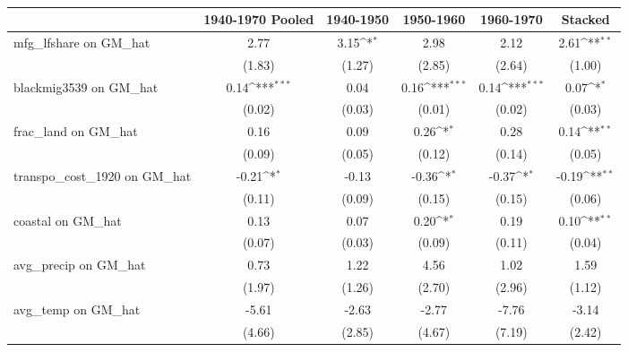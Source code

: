 \begin{table}[htbp]\centering
\def\sym#1{\ifmmode^{#1}\else\(^{#1}\)\fi}
\caption{}
\begin{tabular}{l*{5}{c}}
\toprule
                &\multicolumn{1}{c}{1940-1970 Pooled}&\multicolumn{1}{c}{1940-1950}&\multicolumn{1}{c}{1950-1960}&\multicolumn{1}{c}{1960-1970}&\multicolumn{1}{c}{Stacked}\\
\midrule
mfg\_lfshare on GM\_hat&     2.77         &     3.15\sym{*}  &     2.98         &     2.12         &     2.61\sym{**} \\
                &   (1.83)         &   (1.27)         &   (2.85)         &   (2.64)         &   (1.00)         \\
\addlinespace
blackmig3539 on GM\_hat&     0.14\sym{***}&     0.04         &     0.16\sym{***}&     0.14\sym{***}&     0.07\sym{*}  \\
                &   (0.02)         &   (0.03)         &   (0.01)         &   (0.02)         &   (0.03)         \\
\addlinespace
frac\_land on GM\_hat&     0.16         &     0.09         &     0.26\sym{*}  &     0.28         &     0.14\sym{**} \\
                &   (0.09)         &   (0.05)         &   (0.12)         &   (0.14)         &   (0.05)         \\
\addlinespace
transpo\_cost\_1920 on GM\_hat&    -0.21\sym{*}  &    -0.13         &    -0.36\sym{*}  &    -0.37\sym{*}  &    -0.19\sym{**} \\
                &   (0.11)         &   (0.09)         &   (0.15)         &   (0.15)         &   (0.06)         \\
\addlinespace
coastal on GM\_hat&     0.13         &     0.07         &     0.20\sym{*}  &     0.19         &     0.10\sym{**} \\
                &   (0.07)         &   (0.03)         &   (0.09)         &   (0.11)         &   (0.04)         \\
\addlinespace
avg\_precip on GM\_hat&     0.73         &     1.22         &     4.56         &     1.02         &     1.59         \\
                &   (1.97)         &   (1.26)         &   (2.70)         &   (2.96)         &   (1.12)         \\
\addlinespace
avg\_temp on GM\_hat&    -5.61         &    -2.63         &    -2.77         &    -7.76         &    -3.14         \\
                &   (4.66)         &   (2.85)         &   (4.67)         &   (7.19)         &   (2.42)         \\

\end{tabular}
\end{table}
